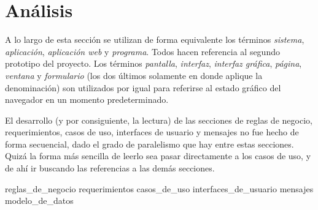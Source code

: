 %
%
%

\section{Análisis}

A lo largo de esta sección se utilizan de forma equivalente los términos
\textit{sistema}, \textit{aplicación}, \textit{aplicación web} y
\textit{programa}. Todos hacen referencia al segundo prototipo del
proyecto. Los términos \textit{pantalla}, \textit{interfaz},
\textit{interfaz gráfica}, \textit{página}, \textit{ventana} y
\textit{formulario} (los dos últimos solamente en donde aplique la
denominación) son utilizados por igual para referirse al estado gráfico
del navegador en un momento predeterminado.

El desarrollo (y por consiguiente, la lectura) de las secciones de reglas de
negocio, requerimientos, casos de uso, interfaces de usuario y mensajes no fue
hecho de forma secuencial, dado el grado de paralelismo que hay entre estas
secciones. Quizá la forma más sencilla de leerlo sea pasar directamente a los
casos de uso, y de ahí ir buscando las referencias a las demás secciones.

{reglas_de_negocio}
{requerimientos}
{casos_de_uso}
{interfaces_de_usuario}
{mensajes}
{modelo_de_datos}
